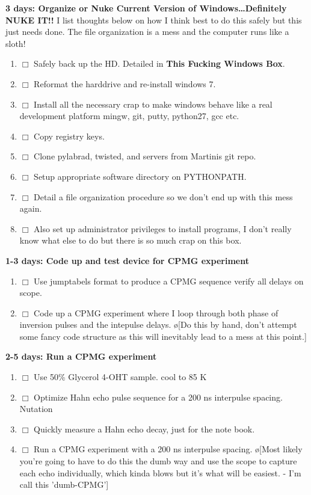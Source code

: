 \documentclass[10pt]{book}
\begin{document}
{{\bf 3 days: Organize or Nuke Current Version of Windows\ldots Definitely NUKE IT!!}
I list thoughts below on how I think best to do this safely but this just needs done. The file organization is a mess and the computer runs like a sloth!
\begin{enumerate}
    \item $\Box$ Safely back up the HD. Detailed in {\bf This Fucking Windows Box}.
    \item $\Box$ Reformat the harddrive and re-install windows 7.
    \item $\Box$ Install all the necessary crap to make windows behave like a real development platform mingw, git, putty, python27, gcc etc.
    \item $\Box$ Copy registry keys.
    \item $\Box$ Clone pylabrad, twisted, and servers from Martinis git repo.
    \item $\Box$ Setup appropriate software directory on PYTHONPATH.
    \item $\Box$ Detail a file organization procedure so we don't end up with this mess again.
    \item $\Box$ Also set up administrator privileges to install programs, I don't really know what else to do but there is so much crap on this box.\\
\end{enumerate}


{\bf 1-3 days: Code up and test device for CPMG experiment}
\begin{enumerate}
    \item $\Box$ Use jumptabels format to produce a CPMG sequence verify all delays on scope.
    \item $\Box$ Code up a CPMG experiment where I loop through both phase of inversion pulses and the intepulse delays. \o[Do this by hand, don't attempt some fancy code structure as this will inevitably lead to a mess at this point.]{}\\
\end{enumerate}


{\bf 2-5 days: Run a CPMG experiment}
\begin{enumerate}
    \item $\Box$ Use 50\% Glycerol 4-OHT sample. cool to 85 K
    \item $\Box$ Optimize Hahn echo pulse sequence for a 200 ns interpulse spacing. Nutation
    \item $\Box$ Quickly measure a Hahn echo decay, just for the note book.
    \item $\Box$ Run a CPMG experiment with a 200 ns interpulse spacing. \o[Most likely you're going to have to do this the dumb way and use the scope to capture each echo individually, which kinda blows but it's what will be easiest. - I'm call this 'dumb-CPMG']{}\\
\end{enumerate}

}
\end{document}

